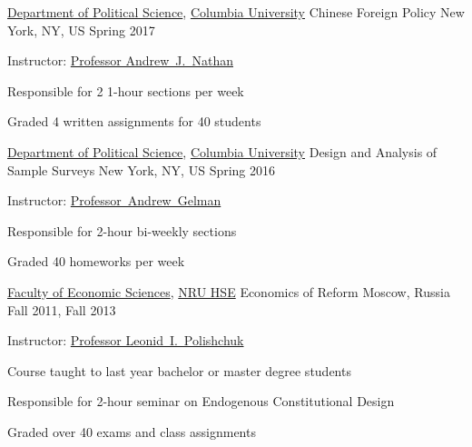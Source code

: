 

\begin{cventries}

  \cventry
    {\href{http://polisci.columbia.edu/}{Department of Political Science}, \href{http://www.columbia.edu/}{Columbia University}} %
    {Chinese Foreign Policy} %
    {New York, NY, US} %
    {Spring 2017} %
    {
      \begin{cvitems} %
        \item {Instructor: \href{http://www.stat.columbia.edu/~gelman/}{Professor Andrew~J.~Nathan}}
        \item {Responsible for 2 1-hour sections per week}
        \item {Graded 4 written assignments for 40 students}
      \end{cvitems}
    }

  \cventry
    {\href{http://polisci.columbia.edu/}{Department of Political Science}, \href{http://www.columbia.edu/}{Columbia University}} %
    {Design and Analysis of Sample Surveys} %
    {New York, NY, US} %
    {Spring 2016} %
    {
      \begin{cvitems} %
        \item {Instructor: \href{http://www.stat.columbia.edu/~gelman/}{Professor~Andrew~Gelman}}
        \item {Responsible for 2-hour bi-weekly sections}
        \item {Graded 40 homeworks per week}
      \end{cvitems}
    }

  \cventry
    {\href{https://economics.hse.ru/en/}{Faculty of Economic Sciences}, \href{http://www.hse.ru/en/}{NRU HSE}} %
    {Economics of Reform} %
    {Moscow, Russia} %
    {Fall 2011, Fall 2013} %
    {
      \begin{cvitems} %
        \item {Instructor: \href{https://www.hse.ru/en/org/persons/65104}{Professor Leonid~I.~Polishchuk}}
        \item {Course taught to last year bachelor or master degree students}
        \item {Responsible for 2-hour seminar on Endogenous Constitutional Design}
        \item {Graded over 40 exams and class assignments}
      \end{cvitems}
    }


\end{cventries}
